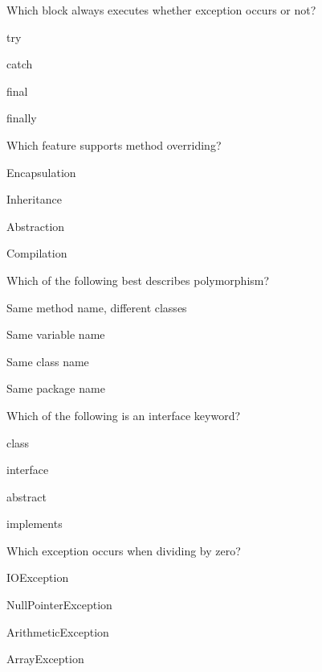\documentclass{USTBExam}
\begin{document}
\begin{question}
Which block always executes whether exception occurs or not?
\paren
\begin{choices}
\item try
\item catch
\item final
\item finally
\end{choices}
\end{question}

\begin{question}
Which feature supports method overriding?
\paren
\begin{choices}
\item Encapsulation
\item Inheritance
\item Abstraction
\item Compilation
\end{choices}
\end{question}

\begin{question}
Which of the following best describes polymorphism?
\paren
\begin{choices}
\item Same method name, different classes
\item Same variable name
\item Same class name
\item Same package name
\end{choices}
\end{question}

\begin{question}
Which of the following is an interface keyword?
\paren
\begin{choices}
\item class
\item interface
\item abstract
\item implements
\end{choices}
\end{question}

\begin{question}
Which exception occurs when dividing by zero?
\paren
\begin{choices}
\item IOException
\item NullPointerException
\item ArithmeticException
\item ArrayException
\end{choices}
\end{question}
\end{document}

